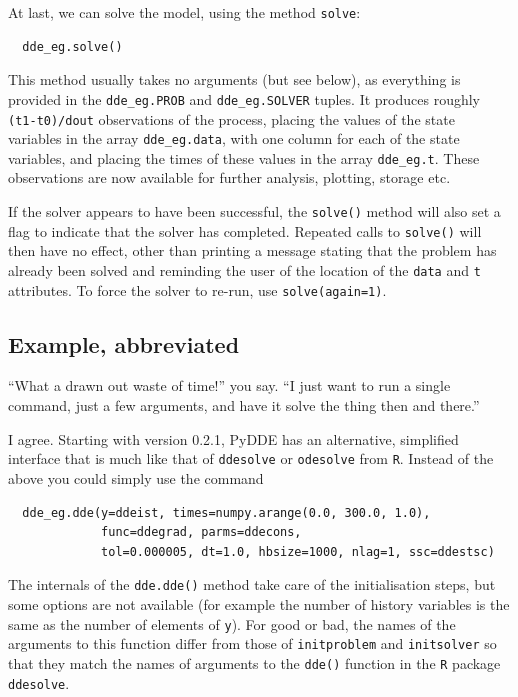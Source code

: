 \documentclass[10pt,a4paper] {article}
\begin{document}
At last, we can solve the model, using the method \verb+solve+:
\begin{verbatim}
  dde_eg.solve()
\end{verbatim}
This method usually takes no arguments (but see below), as everything is provided in the \verb+dde_eg.PROB+ and \verb+dde_eg.SOLVER+ tuples.  It produces roughly \verb+(t1-t0)/dout+ observations of the process, placing the values of the state variables in the array \verb+dde_eg.data+, with one column for each of the state variables, and placing the times of these values in the array \verb+dde_eg.t+.  These observations are now available for further analysis, plotting, storage etc.  

If the solver appears to have been successful, the \verb+solve()+ method will also set a flag to indicate that the solver has completed.  Repeated calls to \verb+solve()+ will then have no effect, other than printing a message stating that the problem has already been solved and reminding the user of the location of the \verb+data+ and \verb+t+ attributes.  To force the solver to re-run, use \verb+solve(again=1)+.

\subsection{Example, abbreviated}

``What a drawn out waste of time!'' you say.  ``I just want to run a single command, just a few arguments, and have it solve the thing then and there.'' 

I agree.  Starting with version 0.2.1, PyDDE has an alternative, simplified interface that is much like that of \verb+ddesolve+ or \verb+odesolve+ from \verb+R+.  Instead of the above you could simply use the command
\begin{verbatim}
  dde_eg.dde(y=ddeist, times=numpy.arange(0.0, 300.0, 1.0), 
             func=ddegrad, parms=ddecons, 
             tol=0.000005, dt=1.0, hbsize=1000, nlag=1, ssc=ddestsc)
\end{verbatim}
The internals of the \verb+dde.dde()+ method take care of the initialisation steps, but some options are not available (for example the number of history variables is the same as the number of elements of \verb+y+).  For good or bad, the names of the arguments to this function differ from those of \verb+initproblem+ and \verb+initsolver+ so that they match the names of arguments to the \verb+dde()+ function in the \verb+R+ package \verb+ddesolve+.
\end{document}
